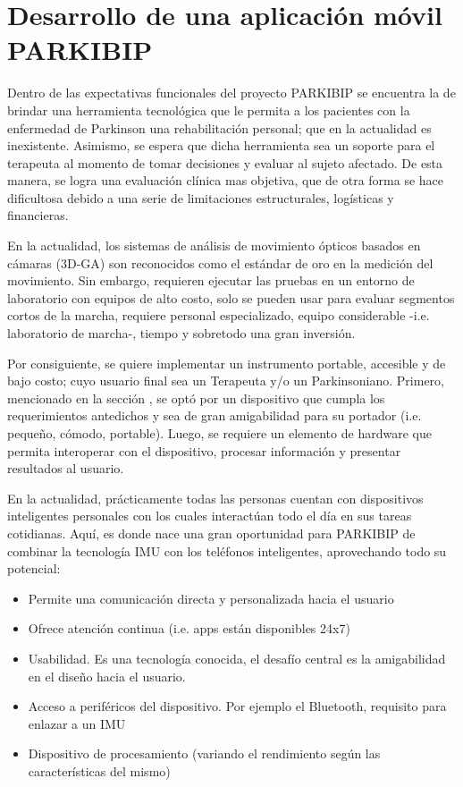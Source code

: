 \section{Desarrollo de una aplicación móvil PARKIBIP}

Dentro de las expectativas funcionales del proyecto PARKIBIP se encuentra la de brindar una herramienta tecnológica que le permita a los pacientes con la enfermedad de Parkinson una rehabilitación personal; que en la actualidad es inexistente. Asimismo, se espera que dicha herramienta sea un soporte para el terapeuta al momento de tomar decisiones y evaluar al sujeto afectado. De esta manera, se logra una evaluación clínica mas objetiva, que de otra forma se hace dificultosa debido a una serie de limitaciones estructurales, logísticas y financieras.

En la actualidad, los sistemas de análisis de movimiento ópticos basados en cámaras (3D-GA) son reconocidos como el estándar de oro en la medición del movimiento. Sin embargo, requieren ejecutar las pruebas en un entorno de laboratorio con equipos de alto costo, solo se pueden usar para evaluar segmentos cortos de la marcha, requiere personal especializado, equipo considerable -i.e. laboratorio de marcha-, tiempo y sobretodo una gran inversión.

Por consiguiente, se quiere implementar un instrumento portable, accesible y de bajo costo; cuyo usuario final sea un Terapeuta y/o un Parkinsoniano. Primero, mencionado en la sección , se optó por un dispositivo que cumpla los requerimientos antedichos y sea de gran amigabilidad para su portador (i.e. pequeño, cómodo, portable). Luego, se requiere un elemento de hardware que permita interoperar con el dispositivo, procesar información y presentar resultados al usuario. 

En la actualidad, prácticamente todas las personas cuentan con dispositivos inteligentes personales con los cuales interactúan todo el día en sus tareas cotidianas. Aquí, es donde nace una gran oportunidad para PARKIBIP de combinar la tecnología IMU con los teléfonos inteligentes, aprovechando todo su potencial:

\begin{itemize}
    \item Permite una comunicación directa y personalizada hacia el usuario
    \item Ofrece atención continua (i.e. apps están disponibles 24x7)
    \item Usabilidad. Es una tecnología conocida, el desafío central es la amigabilidad en el diseño hacia el usuario.
    \item Acceso a periféricos del dispositivo. Por ejemplo el Bluetooth, requisito para enlazar a un IMU
    \item Dispositivo de procesamiento (variando el rendimiento según las características del mismo) 
\end{itemize}


